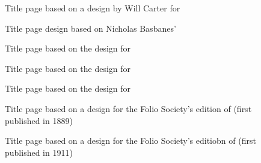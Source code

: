 \documentclass[10pt,letterpaper,extrafontsizes]{memoir}
\begin{document}
\begin{figure}
\centering
\begin{showtitle}
\titleAM
\end{showtitle}
\caption{Title page based on a design by Will Carter for
} \label{fig:titleAM}
\end{figure}


\begin{figure}
\centering
\begin{showtitle}
\titlePM
\end{showtitle}
\caption{Title page design based on Nicholas Basbanes' } \label{fig:titlePM}
\end{figure}


\begin{figure}
\centering
\begin{showtitle}
\titleAT
\end{showtitle}
\caption{Title page based on the design for } \label{fig:titleAT}
\end{figure}


\begin{figure}
\centering
\begin{showtitle}
\titleLL
\end{showtitle}
\caption{Title page based on the design for } \label{fig:titleLL}
\end{figure}


\begin{figure}
\centering
\begin{showtitle}
\titleSW
\end{showtitle}
\caption{Title page based on the design for } \label{fig:titleSW}
\end{figure}


\begin{figure}
\centering
\begin{showtitle}
\titleTMB
\end{showtitle}
\caption{Title page based on a design for the Folio Society's edition of
   (first published in 1889)} \label{fig:titleTMB}
\end{figure}


\begin{figure}
\centering
\begin{showtitle}
\titleZD
\end{showtitle}
\caption{Title page based on a design for the Folio Society's editiobn of
   (first published in 1911)} \label{fig:titleZD}
\end{figure}
\end{document}
